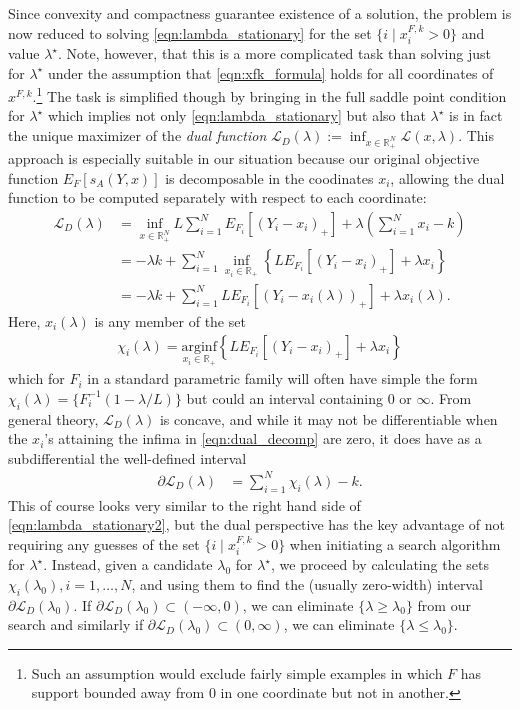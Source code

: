 \documentclass{article}
\begin{document}
Since convexity and compactness guarantee existence of a solution, the problem is now reduced to solving \eqref{eqn:lambda_stationary} for the set 
$\{i \mid x_i^{F,k} > 0\}$ and value $\lambda^{\star}$. Note, however, that this is a more complicated task than solving just 
for $\lambda^{\star}$ under the assumption that \eqref{eqn:xfk_formula} holds for all coordinates of $x^{F,k}$.\footnote{Such an assumption would exclude fairly simple examples in which $F$ has support bounded away from $0$ in one coordinate but not in another.} The task is simplified though by bringing in the full saddle point condition for $\lambda^{\star}$ which implies not only \eqref{eqn:lambda_stationary} but also that
$\lambda^{\star}$ is in fact the unique maximizer of the \emph{dual function} 
$\mathcal{L}_D(\lambda) := \inf_{x \in \mathbb{R}_{+}^N} \mathcal{L}(x, \lambda)$.
This approach is especially suitable in our situation because our original objective function $E_F\left[s_A(Y,x)\right]$ is decomposable in the coodinates $x_i$, allowing the dual function to be computed separately with respect to each coordinate:
\begin{align}
\mathcal{L}_D(\lambda) &= \inf_{x \in \mathbb{R}_{+}^N} L\sum_{i=1}^{N} E_{F_i}[(Y_i - x_i)_{+}] + \lambda\left(\sum_{i=1}^{N} x_i - k\right) \\
&= - \lambda k + \sum_{i=1}^{N} \inf_{x_i \in \mathbb{R}_{+}}\left\{ L E_{F_i}[(Y_i - x_i)_{+}] + \lambda x_i\right\}  \label{eqn:dual_decomp} \\
&= - \lambda k + \sum_{i=1}^{N}  LE_{F_i}[(Y_i - x_i(\lambda))_{+}] + \lambda x_i(\lambda).
\end{align}
Here, $x_i(\lambda)$ is any member of the set 
\begin{align}
\chi_i(\lambda) = \underset{x_i \in \mathbb{R}_{+}}{\mathrm{arginf}} \left\{ L E_{F_i}[(Y_i - x_i)_{+}] + \lambda x_i\right\}
\end{align}
which for $F_i$ in a standard parametric family will often have simple the form $\chi_i(\lambda) = \{F_i^{-1}(1-\lambda/L)\}$ but could an interval containing $0$ or $\infty$.
From general theory, $\mathcal{L}_D(\lambda)$ is concave, and while it may not be differentiable when the $x_i$'s attaining the infima in \eqref{eqn:dual_decomp} are zero, it does have as a subdifferential the well-defined interval
\begin{align}
\partial \mathcal{L}_D(\lambda) 
&= \sum_{i=1}^N \chi_i(\lambda) - k.
\end{align}
This of course looks very similar to the right hand side of \eqref{eqn:lambda_stationary2}, but the dual perspective has the key advantage of not requiring any guesses of the set $\{i \mid x_i^{F,k} > 0\}$ when initiating a search algorithm for $\lambda^{\star}$.  Instead, given a candidate $\lambda_0$ for $\lambda^{\star}$, we proceed by calculating the sets $\chi_i(\lambda_0), i = 1,\ldots,N$, and using them to find the (usually zero-width) interval $\partial \mathcal{L}_D(\lambda_0)$. If $\partial \mathcal{L}_D(\lambda_0) \subset (-\infty,0)$, we can eliminate $\{\lambda \geq \lambda_0\}$ from our search and similarly if $\partial \mathcal{L}_D(\lambda_0) \subset (0, \infty)$, we can eliminate $\{\lambda \leq \lambda_0\}$. 
\end{document}
